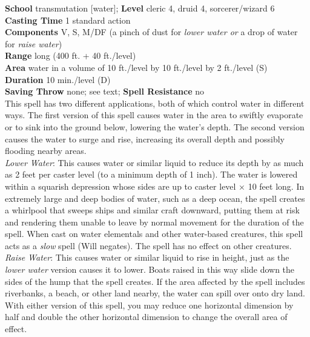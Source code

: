 \textbf{School} transmutation [water]; \textbf{Level} cleric 4, druid 4, sorcerer/wizard 6\\
\textbf{Casting Time} 1 standard action\\
\textbf{Components} V, S, M/DF (a pinch of dust for \textit{lower water or }a drop of water for \textit{raise water})\\
\textbf{Range} long (400 ft. + 40 ft./level)\\
\textbf{Area }water in a volume of 10 ft./level by 10 ft./level by 2 ft./level (S)\\
\textbf{Duration} 10 min./level (D)\\
\textbf{Saving Throw} none; see text; \textbf{Spell Resistance} no\\
This spell has two different applications, both of which control water in different ways. The first version of this spell causes water in the area to swiftly evaporate or to sink into the ground below, lowering the water's depth. The second version causes the water to surge and rise, increasing its overall depth and possibly flooding nearby areas.\\
\textit{Lower Water}: This causes water or similar liquid to reduce its depth by as much as 2 feet per caster level (to a minimum depth of 1 inch). The water is lowered within a squarish depression whose sides are up to caster level × 10 feet long. In extremely large and deep bodies of water, such as a deep ocean, the spell creates a whirlpool that sweeps ships and similar craft downward, putting them at risk and rendering them unable to leave by normal movement for the duration of the spell. When cast on water elementals and other water-based creatures, this spell acts as a \textit{slow }spell (Will negates). The spell has no effect on other creatures.\\
\textit{Raise Water}: This causes water or similar liquid to rise in height, just as the \textit{lower water }version causes it to lower. Boats raised in this way slide down the sides of the hump that the spell creates. If the area affected by the spell includes riverbanks, a beach, or other land nearby, the water can spill over onto dry land.\\
With either version of this spell, you may reduce one horizontal dimension by half and double the other horizontal dimension to change the overall area of effect.\\
